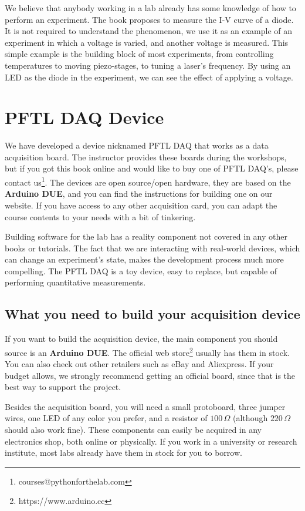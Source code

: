 We believe that anybody working in a lab already has some knowledge of how to perform an experiment. The book proposes to measure the I-V curve of a diode. It is not required to understand the phenomenon, we use it as an example of an experiment in which a voltage is varied, and another voltage is measured. This simple example is the building block of most experiments, from controlling temperatures to moving piezo-stages, to tuning a laser's frequency. By using an LED as the diode in the experiment, we can see the effect of applying a voltage. 

\section{PFTL DAQ Device}\label{sec:pftl-daq-device}
We have developed a device nicknamed {PFTL DAQ} that works as a data acquisition board. The instructor provides these boards during the workshops, but if you got this book online and would like to buy one of PFTL DAQ's, please contact us\footnote{courses@pythonforthelab.com}. The devices are open source/open hardware, they are based on the \textbf{Arduino DUE}, and you can find the instructions for building one on our website. If you have access to any other acquisition card, you can adapt the course contents to your needs with a bit of tinkering.

Building software for the lab has a reality component not covered in any other books or tutorials. The fact that we are interacting with real-world devices, which can change an experiment's state, makes the development process much more compelling. The PFTL DAQ is a toy device, easy to replace, but capable of performing quantitative measurements.

\subsection{What you need to build your acquisition device}
If you want to build the acquisition device, the main component you should source is an \textbf{Arduino DUE}. The official web store\footnote{https://www.arduino.cc} usually has them in stock. You can also check out other retailers such as eBay and Aliexpress. If your budget allows, we strongly recommend getting an official board, since that is the best way to support the project. 

Besides the acquisition board, you will need a small protoboard, three jumper wires, one LED of any color you prefer, and a resistor of $100\,\Omega$ (although $220\,\Omega$ should also work fine). These components can easily be acquired in any electronics shop, both online or physically. If you work in a university or research institute, most labs already have them in stock for you to borrow. 

